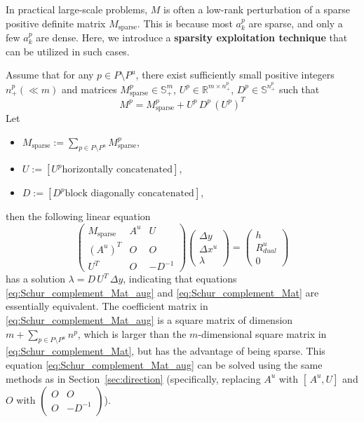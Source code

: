 In practical large-scale problems, $M$ is often a low-rank perturbation of a sparse positive definite matrix $M_{\mathrm{sparse}}$. This is because most $a^p_k$ are sparse, and only a few $a^p_k$ are dense.
Here, we introduce a \textbf{sparsity exploitation technique} that can be utilized in such cases.

Assume that for any $p\in P\setminus P^u$, there exist sufficiently small positive integers $n^p_+(\ll m)$ and matrices $M^p_{\mathrm{sparse}} \in \mathbb{S}^m_+$, $U^p \in \mathbb{R}^{m\times n^p_+}$, $D^p\in \mathbb{S}^{n^p_+}$ such that
\begin{equation}
  M^p = M^p_{\mathrm{sparse}} + U^p\, D^p\, (U^p)^T
  \label{eq:low_rank_perturbation}
\end{equation}
Let 
\begin{itemize}
\item $M_{\mathrm{sparse}} := \sum_{p\in P\setminus P^u} M^p_{\mathrm{sparse}}$,
\item $U := [U^p \text{horizontally concatenated}]$, 
\item $D:=[D^p\text{block diagonally concatenated}]$,
\end{itemize}
then the following linear equation
\begin{equation}
  \begin{pmatrix}
    M_{\mathrm{sparse}} & A^u & U \\
    (A^u)^T & O & O \\
    U^T & O & -D^{-1}
  \end{pmatrix}
  \begin{pmatrix}
    \Delta y \\
    \Delta x^u \\
    \lambda
  \end{pmatrix}
  =
  \begin{pmatrix}
    h \\
    R^u_{dual} \\
    0
  \end{pmatrix}
  \label{eq:Schur_complement_Mat_aug}
\end{equation}
has a solution $\lambda = D\,U^T\,\Delta y$, indicating that equations \eqref{eq:Schur_complement_Mat_aug} and \eqref{eq:Schur_complement_Mat} are essentially equivalent.
The coefficient matrix in \eqref{eq:Schur_complement_Mat_aug} is a square matrix of dimension $m+\sum_{p\in P\setminus P^u} n^p$, which is larger than the $m$-dimensional square matrix in \eqref{eq:Schur_complement_Mat}, but has the advantage of being sparse.
This equation \eqref{eq:Schur_complement_Mat_aug} can be solved using the same methods as in Section~\ref{sec:direction}
(specifically, replacing $A^u$ with $[\,A^u, U]$ and $O$ with $\begin{pmatrix} O & O \\ O & -D^{-1} \end{pmatrix}$).

